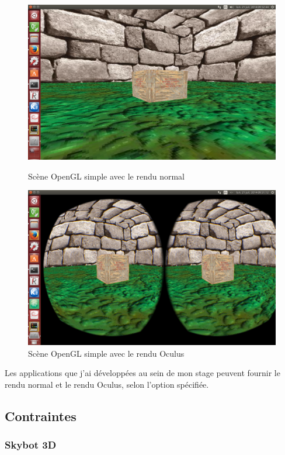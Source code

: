\documentclass[a4paper,french,12pt]{article}
\begin{document}
			    \begin{figure}
			      \centering
				\includegraphics[width=1.0\textwidth]{scene_normal4.png}
			      \caption{Scène OpenGL simple avec le rendu normal}

				\includegraphics[width=1.0\textwidth]{scene_oculus4.png}
			      \caption{Scène OpenGL simple avec le rendu Oculus}
			    \end{figure}
			    \clearpage
			    
			    
			    
			    
			    Les applications que j'ai développées au sein de mon stage peuvent fournir le rendu normal 
			    et le rendu Oculus, selon l'option spécifiée.

		
	\subsection{Contraintes}
	
	\subsubsection{Skybot 3D}
\end{document}
